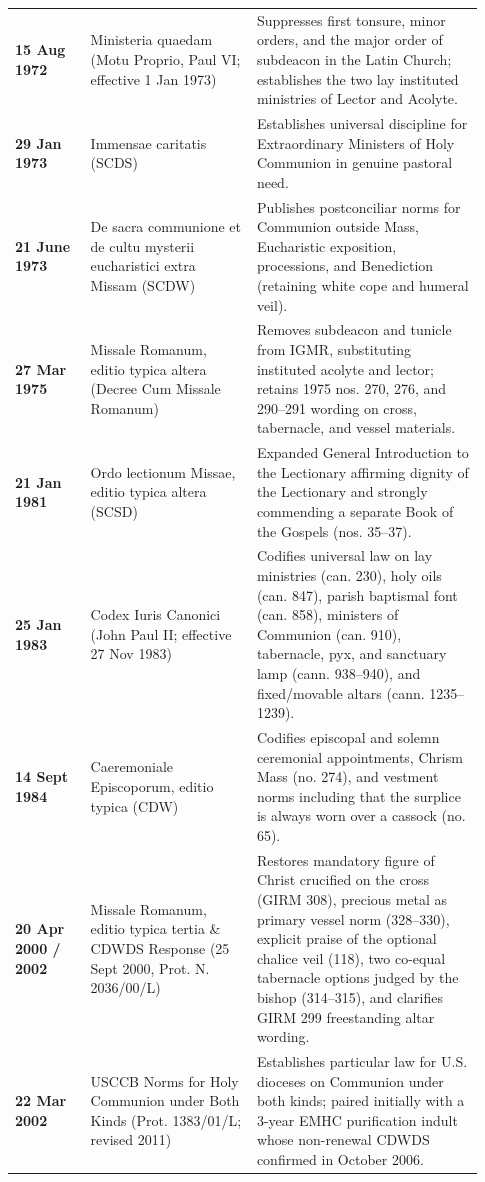 {\begin{longtable}{>{\raggedright\arraybackslash}p{0.15\linewidth}>{\raggedright\arraybackslash}p{0.33\linewidth}>{\raggedright\arraybackslash}p{0.45\linewidth}}
\textbf{15 Aug 1972} & Ministeria quaedam (Motu Proprio, Paul VI; effective 1 Jan 1973) & Suppresses first tonsure, minor orders, and the major order of subdeacon in the Latin Church; establishes the two lay instituted ministries of Lector and Acolyte. \\
\textbf{29 Jan 1973} & Immensae caritatis (SCDS) & Establishes universal discipline for Extraordinary Ministers of Holy Communion in genuine pastoral need. \\
\textbf{21 June 1973} & De sacra communione et de cultu mysterii eucharistici extra Missam (SCDW) & Publishes postconciliar norms for Communion outside Mass, Eucharistic exposition, processions, and Benediction (retaining white cope and humeral veil). \\
\textbf{27 Mar 1975} & Missale Romanum, editio typica altera (Decree Cum Missale Romanum) & Removes subdeacon and tunicle from IGMR, substituting instituted acolyte and lector; retains 1975 nos. 270, 276, and 290--291 wording on cross, tabernacle, and vessel materials. \\
\textbf{21 Jan 1981} & Ordo lectionum Missae, editio typica altera (SCSD) & Expanded General Introduction to the Lectionary affirming dignity of the Lectionary and strongly commending a separate Book of the Gospels (nos. 35--37). \\
\textbf{25 Jan 1983} & Codex Iuris Canonici (John Paul II; effective 27 Nov 1983) & Codifies universal law on lay ministries (can. 230), holy oils (can. 847), parish baptismal font (can. 858), ministers of Communion (can. 910), tabernacle, pyx, and sanctuary lamp (cann. 938--940), and fixed/movable altars (cann. 1235--1239). \\
\textbf{14 Sept 1984} & Caeremoniale Episcoporum, editio typica (CDW) & Codifies episcopal and solemn ceremonial appointments, Chrism Mass (no. 274), and vestment norms including that the surplice is always worn over a cassock (no. 65). \\
\textbf{20 Apr 2000 / 2002} & Missale Romanum, editio typica tertia \& CDWDS Response (25 Sept 2000, Prot. N. 2036/00/L) & Restores mandatory figure of Christ crucified on the cross (GIRM 308), precious metal as primary vessel norm (328--330), explicit praise of the optional chalice veil (118), two co-equal tabernacle options judged by the bishop (314--315), and clarifies GIRM 299 freestanding altar wording. \\
\textbf{22 Mar 2002} & USCCB Norms for Holy Communion under Both Kinds (Prot. 1383/01/L; revised 2011) & Establishes particular law for U.S. dioceses on Communion under both kinds; paired initially with a 3-year EMHC purification indult whose non-renewal CDWDS confirmed in October 2006. \\

\end{longtable}}
